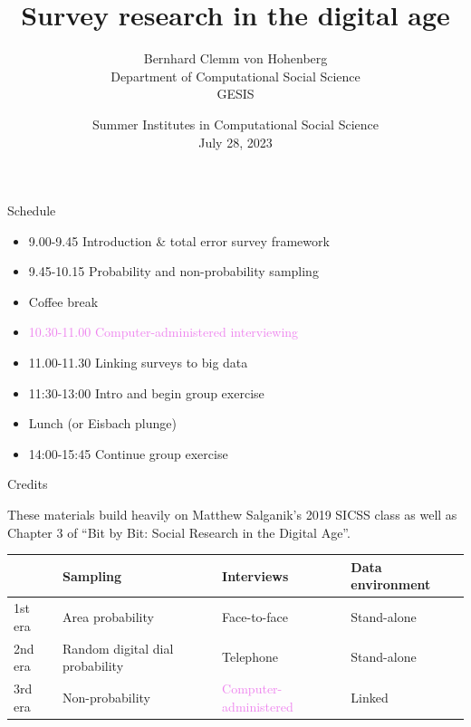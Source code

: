 \documentclass[aspectratio=169]{beamer}
\title[]{Survey research in the digital age}
\author[]{Bernhard Clemm von Hohenberg\\Department of Computational Social Science\\GESIS}
\date[]{Summer Institutes in Computational Social Science\\July 28, 2023}
\begin{document}
\frame{\titlepage}
\begin{frame}{Schedule}

\vspace{0.5em}
\begin{itemize}
\item 9.00-9.45 Introduction \& total error survey framework
\item 9.45-10.15 Probability and non-probability sampling
\vspace{0.5em}
\item Coffee break
\vspace{0.5em}
\item \textcolor{violet}{10.30-11.00 Computer-administered interviewing}
\item 11.00-11.30 Linking surveys to big data
\item 11:30-13:00 Intro and begin group exercise
\vspace{0.5em}
\item Lunch (or Eisbach plunge)
\vspace{0.5em}
\item 14:00-15:45 Continue group exercise
\end{itemize}

\end{frame}
\begin{frame}{Credits}

These materials build heavily on Matthew Salganik's 2019 SICSS class as well as Chapter 3 of ``Bit by Bit: Social Research in the Digital Age''.

\end{frame}
\begin{frame}
\begin{center}
\renewcommand{\arraystretch}{1.5}
\begin{tabular}{p{}p{}p{}p{}}
& \textbf{Sampling} & \textbf{Interviews} & \textbf{Data environment}\\
\hline \hline
1st era & Area probability & Face-to-face & Stand-alone \\
\hline
2nd era & Random digital dial probability & Telephone & Stand-alone \\
\hline
3rd era & Non-probability & \textcolor{violet}{Computer-administered} & Linked \\
\end{tabular}
\end{center}

\end{frame}
\end{document}
